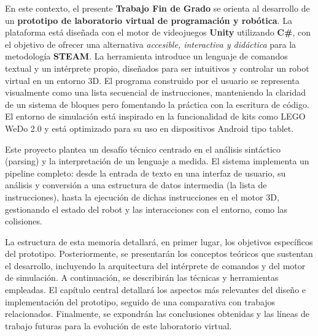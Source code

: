 En este contexto, el presente \textbf{Trabajo Fin de Grado} se orienta al desarrollo de un \textbf{prototipo de laboratorio virtual de programación y robótica}. La plataforma está diseñada con el motor de videojuegos \textbf{Unity} utilizando \textbf{C\#}, con el objetivo de ofrecer una alternativa \textit{accesible, interactiva y didáctica} para la metodología \textbf{STEAM}. La herramienta introduce un lenguaje de comandos textual y un intérprete propio, diseñados para ser intuitivos y controlar un robot virtual en un entorno 3D. El programa construido por el usuario se representa visualmente como una lista secuencial de instrucciones, manteniendo la claridad de un sistema de bloques pero fomentando la práctica con la escritura de código. El entorno de simulación está inspirado en la funcionalidad de kits como LEGO WeDo 2.0 y está optimizado para su uso en dispositivos Android tipo tablet.


Este proyecto  plantea un desafío técnico centrado en el análisis sintáctico (parsing) y la interpretación de un lenguaje a medida. El sistema implementa un pipeline completo: desde la entrada de texto en una interfaz de usuario, su análisis y conversión a una estructura de datos intermedia (la lista de instrucciones), hasta la ejecución de dichas instrucciones en el motor 3D, gestionando el estado del robot y las interacciones con el entorno, como las colisiones.

La estructura de esta memoria detallará, en primer lugar, los objetivos específicos del prototipo. Posteriormente, se presentarán los conceptos teóricos que sustentan el desarrollo, incluyendo la arquitectura del intérprete de comandos y del motor de simulación. A continuación, se describirán las técnicas y herramientas empleadas. El capítulo central detallará los aspectos más relevantes del diseño e implementación del prototipo, seguido de una comparativa con trabajos relacionados. Finalmente, se expondrán las conclusiones obtenidas y las líneas de trabajo futuras para la evolución de este laboratorio virtual.